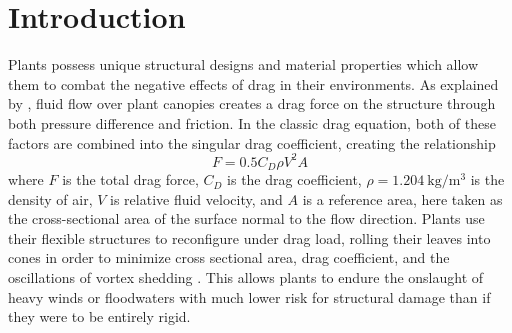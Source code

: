 \section{Introduction}


Plants possess unique structural designs and material properties which allow them to combat the negative effects of drag in their environments. As explained by \citet{delangre2008effects}, fluid flow over plant canopies creates a drag force on the structure through both pressure difference and friction. In the classic drag equation, both of these factors are combined into the singular drag coefficient, creating the relationship
\begin{equation}
F=0.5 C_D \rho V^2 A
\label{eq:drag}
\end{equation}
where $F$ is the total drag force, $C_D$ is the drag coefficient, $\rho=\SI{1.204}{\kilo\gram\per\meter\cubed}$ is the density of air, $V$ is relative fluid velocity, and $A$ is a reference area, here taken as the cross-sectional area of the surface normal to the flow direction. Plants use their flexible structures to reconfigure under drag load, rolling their leaves into cones in order to minimize cross sectional area, drag coefficient, and the oscillations of vortex shedding \citep{vogel1989drag}. This allows plants to endure the onslaught of heavy winds or floodwaters with much lower risk for structural damage than if they were to be entirely rigid. 

